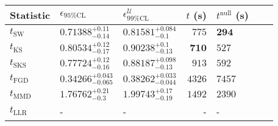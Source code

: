 \begin{tabular}{l|llr|llr}
	Statistic & $\epsilon_{95\%\mathrm{CL}}$ & $\epsilon^    {\mathcal{U}}_{99\%\mathrm{CL}}$ & $t$ (s) & $t^{\mathrm{null}}$ (s) \\
	\midrule
	$t_{\mathrm{SW}}$ & $0.71388_{-0.14}^{+0.11}$ & $0.81581_{-0.1}^{+0.084}$ & $775$ & ${\mathbf{294}}$ \\
	$t_{\overline{\mathrm{KS}}}$ & $0.80534_{-0.17}^{+0.12}$ & $0.90238_{-0.13}^{+0.1}$ & ${\mathbf{710}}$ & $527$ \\
	$t_{\mathrm{SKS}}$ & $0.77724_{-0.16}^{+0.12}$ & $0.88187_{-0.13}^{+0.098}$ & $913$ & $592$ \\
	$t_{\mathrm{FGD}}$ & ${\mathbf{0.34266_{-0.065}^{+0.043}}}$ & ${\mathbf{0.38262_{-0.044}^{+0.033}}}$ & $4326$ & $7457$ \\
	$t_{\mathrm{MMD}}$ & $1.76762_{-0.3}^{+0.21}$ & $1.99743_{-0.19}^{+0.17}$ & $1492$ & $2390$ \\
	$t_{\mathrm{LLR}}$ & - & - & - & - \\
	\bottomrule
\end{tabular}
